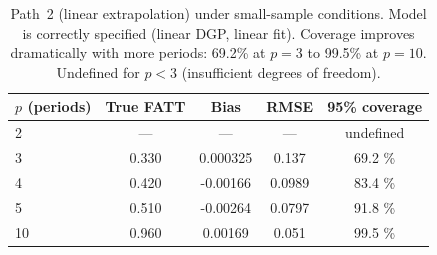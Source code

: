 \begin{table}[htbp]
\centering
\caption{Path~2 (linear extrapolation) under small-sample conditions.
Model is correctly specified (linear DGP, linear fit).
Coverage improves dramatically with more periods: 69.2\% at \(p=3\) to 99.5\% at \(p=10\).
Undefined for \(p < 3\) (insufficient degrees of freedom).}
\label{tab:section8_3b}
\begin{tabular}{lcccc}
\toprule
\(p\) (periods) & True FATT & Bias & RMSE & 95\% coverage \\
\midrule
2 & --- & --- & --- & undefined \\
3 &
0.330
 &
0.000325
 &
0.137
 &
69.2
\% \\
4 &
0.420
 &
-0.00166
 &
0.0989
 &
83.4
\% \\
5 &
0.510
 &
-0.00264
 &
0.0797
 &
91.8
\% \\
10 &
0.960
 &
0.00169
 &
0.051
 &
99.5
\% \\
\bottomrule
\end{tabular}
\end{table}

